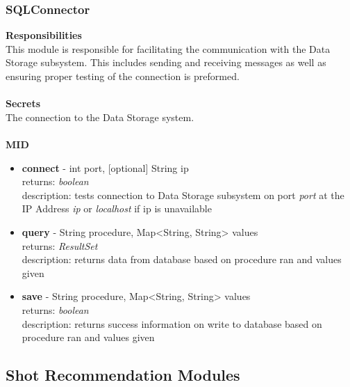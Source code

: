 \documentclass[11pt]{article}
\begin{document}
\subsubsection*{SQLConnector}
\textbf{Responsibilities} \\
This module is responsible for facilitating the communication with the Data Storage subsystem. This includes sending and receiving messages as well as ensuring proper testing of the connection is preformed. \\ \\
\textbf{Secrets} \\
The connection to the Data Storage system. \\ \\
\textbf{MID}
\begin{itemize}
\item \textbf{connect} - int port, [optional] String ip \\ returns: \textit{boolean} \\ description: tests connection to Data Storage subsystem on port \textit{port} at the IP Address \textit{ip} or \textit{localhost} if ip is unavailable
\item \textbf{query} - String procedure, Map<String, String> values \\ returns: \textit{ResultSet} \\ description: returns data from database based on procedure ran and values given
\item \textbf{save} - String procedure, Map<String, String> values \\ returns: \textit{boolean} \\ description: returns success information on write to database based on procedure ran and values given
\end{itemize}

\subsection{Shot Recommendation Modules} %
\end{document}
